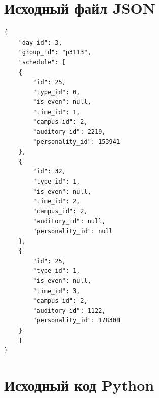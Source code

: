 \documentclass[11pt]{article}
\begin{document}
\section{Исходный файл JSON}
\label{sec:orgedb800e}
\scriptsize
\lstset{language=json,label= ,caption= ,captionpos=b,numbers=none}
\begin{lstlisting}
{
    "day_id": 3,
    "group_id": "p3113",
    "schedule": [
	{
	    "id": 25,
	    "type_id": 0,
	    "is_even": null,
	    "time_id": 1,
	    "campus_id": 2,
	    "auditory_id": 2219,
	    "personality_id": 153941
	},
	{
	    "id": 32,
	    "type_id": 1,
	    "is_even": null,
	    "time_id": 2,
	    "campus_id": 2,
	    "auditory_id": null,
	    "personality_id": null
	},
	{
	    "id": 25,
	    "type_id": 1,
	    "is_even": null,
	    "time_id": 3,
	    "campus_id": 2,
	    "auditory_id": 1122,
	    "personality_id": 178308
	}
    ]
}
\end{lstlisting}

\section{Исходный код Python}
\label{sec:org41a196a}
\end{document}
